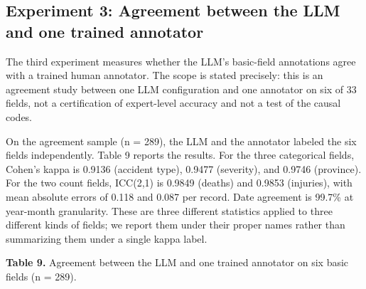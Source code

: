 \documentclass[11pt]{article}
\begin{document}
\subsection{Experiment 3: Agreement between the LLM and one trained annotator}
The third experiment measures whether the LLM's basic-field annotations agree with a trained human annotator. The scope is stated precisely: this is an agreement study between one LLM configuration and one annotator on six of 33 fields, not a certification of expert-level accuracy and not a test of the causal codes.

On the agreement sample (n = 289), the LLM and the annotator labeled the six fields independently. Table 9 reports the results. For the three categorical fields, Cohen's kappa is 0.9136 (accident type), 0.9477 (severity), and 0.9746 (province). For the two count fields, ICC(2,1) is 0.9849 (deaths) and 0.9853 (injuries), with mean absolute errors of 0.118 and 0.087 per record. Date agreement is 99.7\% at year-month granularity. These are three different statistics applied to three different kinds of fields; we report them under their proper names rather than summarizing them under a single kappa label.

\textbf{Table 9.} Agreement between the LLM and one trained annotator on six basic fields (n = 289).
\end{document}
